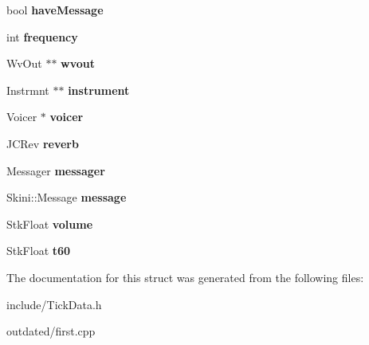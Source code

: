 \begin{DoxyCompactItemize}
\item 
\hypertarget{structTickData_a142d947db0ab6e66f8f912c51a4bafdb}{bool {\bfseries have\-Message}}\label{structTickData_a142d947db0ab6e66f8f912c51a4bafdb}

\item 
\hypertarget{structTickData_ade8d551a52ad93b8f056bf5da813c64c}{int {\bfseries frequency}}\label{structTickData_ade8d551a52ad93b8f056bf5da813c64c}

\item 
\hypertarget{structTickData_a99559444aee6dbc126f650744c5487ec}{Wv\-Out $\ast$$\ast$ {\bfseries wvout}}\label{structTickData_a99559444aee6dbc126f650744c5487ec}

\item 
\hypertarget{structTickData_aa2b6f7f6ad9c886711e9393aca979677}{Instrmnt $\ast$$\ast$ {\bfseries instrument}}\label{structTickData_aa2b6f7f6ad9c886711e9393aca979677}

\item 
\hypertarget{structTickData_ade98160894388bc8534d2003a7a63ffe}{Voicer $\ast$ {\bfseries voicer}}\label{structTickData_ade98160894388bc8534d2003a7a63ffe}

\item 
\hypertarget{structTickData_a3d1563b3668509206700be3e02138827}{J\-C\-Rev {\bfseries reverb}}\label{structTickData_a3d1563b3668509206700be3e02138827}

\item 
\hypertarget{structTickData_a3d0c2a9deef2fd2bd94b3ba8c6b176eb}{Messager {\bfseries messager}}\label{structTickData_a3d0c2a9deef2fd2bd94b3ba8c6b176eb}

\item 
\hypertarget{structTickData_a3061482937dae6c292d4d51400a6143a}{Skini\-::\-Message {\bfseries message}}\label{structTickData_a3061482937dae6c292d4d51400a6143a}

\item 
\hypertarget{structTickData_a6d0680a0bcc9d2c35104ad9721777223}{Stk\-Float {\bfseries volume}}\label{structTickData_a6d0680a0bcc9d2c35104ad9721777223}

\item 
\hypertarget{structTickData_adf8ffe69c6880e995aec842a032ee9fe}{Stk\-Float {\bfseries t60}}\label{structTickData_adf8ffe69c6880e995aec842a032ee9fe}

\end{DoxyCompactItemize}


The documentation for this struct was generated from the following files\-:\begin{DoxyCompactItemize}
\item 
include/Tick\-Data.\-h\item 
outdated/first.\-cpp\end{DoxyCompactItemize}
